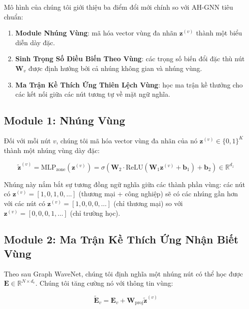\documentclass[12pt,a4paper]{article}
\begin{document}
Mô hình của chúng tôi giới thiệu ba điểm đổi mới chính so với AH-GNN tiêu chuẩn:

\begin{enumerate}
    \item \textbf{Module Nhúng Vùng}: mã hóa vector vùng đa nhãn
          $\mathbf{z}^{(v)}$ thành một biểu diễn dày đặc.
    \item \textbf{Sinh Trọng Số Điều Biến Theo Vùng}: các trọng số biến đổi
          đặc thù nút $\mathbf{W}_v$ được định hướng bởi cả nhúng không gian và nhúng vùng.
    \item \textbf{Ma Trận Kề Thích Ứng Thiên Lệch Vùng}: học ma trận kề thưởng cho
          các kết nối giữa các nút tương tự về mặt ngữ nghĩa.
\end{enumerate}

\subsection{Module 1: Nhúng Vùng}

Đối với mỗi nút $v$, chúng tôi mã hóa vector vùng đa nhãn của nó
$\mathbf{z}^{(v)} \in \{0,1\}^K$ thành một nhúng vùng dày đặc:

\begin{equation}
\tilde{\mathbf{z}}^{(v)} = \text{MLP}_{\text{zone}}\!\left(\mathbf{z}^{(v)}\right)
= \sigma\!\left(\mathbf{W}_2 \cdot \text{ReLU}(\mathbf{W}_1 \mathbf{z}^{(v)} + \mathbf{b}_1) + \mathbf{b}_2\right)
\in \mathbb{R}^{d_z}
\end{equation}

Nhúng này nắm bắt sự tương đồng ngữ nghĩa giữa các thành phần vùng:
các nút có $\mathbf{z}^{(v)} = [1,0,1,0,\ldots]$ (thương mại + công nghiệp) sẽ
có các nhúng gần hơn với các nút có $\mathbf{z}^{(v)} = [1,0,0,0,\ldots]$
(chỉ thương mại) so với $\mathbf{z}^{(v)} = [0,0,0,1,\ldots]$ (chỉ trường học).

\subsection{Module 2: Ma Trận Kề Thích Ứng Nhận Biết Vùng}

Theo sau Graph WaveNet, chúng tôi định nghĩa một nhúng nút có thể học được
$\mathbf{E} \in \mathbb{R}^{N \times d_e}$. Chúng tôi tăng cường nó với thông tin vùng:

\begin{equation}
\tilde{\mathbf{E}}_v = \mathbf{E}_v + \mathbf{W}_{\text{proj}} \tilde{\mathbf{z}}^{(v)}
\end{equation}
\end{document}
